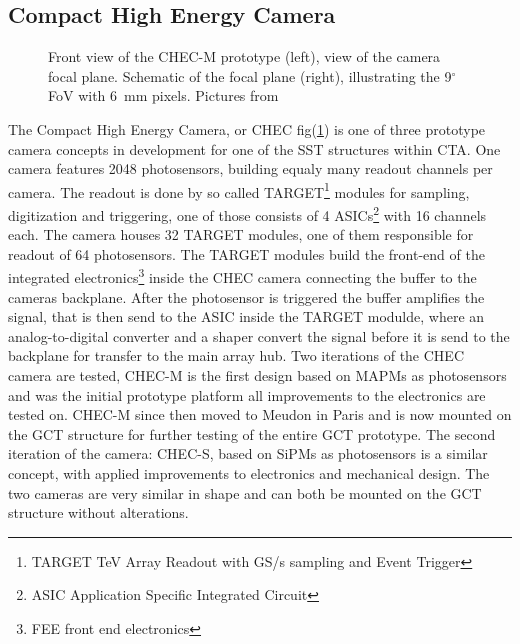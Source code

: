 \documentclass[12pt,article,type=msc,colorback,accentcolor=tud9c]{tudthesis}
\begin{document}
\subsection{Compact High Energy Camera}
\begin{figure}[b!]
\begin{centering}
\caption[CHEC focal plane]{Front view of the CHEC-M prototype (left), view of the camera focal plane. Schematic of the focal plane (right), illustrating the 9$^\circ$ FoV with 6~mm pixels. Pictures from \cite{Rich}}
\label{fig:GCT_Pic}
\end{centering}
\end{figure}


The Compact High Energy Camera, or CHEC fig(\ref{fig:GCT_Pic}) is one of three prototype camera concepts in development for one of the SST structures within CTA. One camera features 2048 photosensors, building equaly many readout channels per camera. The readout is done by so called TARGET\footnote{TARGET TeV Array Readout with GS/s sampling and Event Trigger} modules for sampling, digitization and triggering, one of those consists of 4 ASICs\footnote{ASIC Application Specific Integrated Circuit} with 16 channels each. The camera houses 32 TARGET modules, one of them responsible for readout of 64 photosensors. The TARGET modules build the front-end of the integrated electronics\footnote{FEE front end electronics} inside the CHEC camera connecting the buffer to the cameras backplane. After the photosensor is triggered the buffer amplifies the signal, that is then send to the ASIC inside the TARGET modulde, where an analog-to-digital converter and a shaper convert the signal before it is send to the backplane for transfer to the main array hub. Two iterations of the CHEC camera are tested, CHEC-M is the first design based on MAPMs as photosensors and was the initial prototype platform all improvements to the electronics are tested on. CHEC-M since then moved to Meudon in Paris and is now mounted on the GCT structure for further testing of the entire GCT prototype. The second iteration of the camera: CHEC-S, based on SiPMs as photosensors is a similar concept, with applied improvements to electronics and mechanical design. The two cameras are very similar in shape and can both be mounted on the GCT structure without alterations.\\
\end{document}
